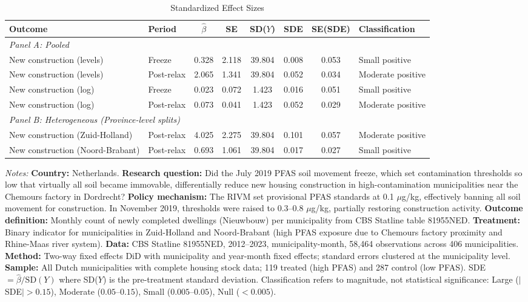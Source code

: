 \begin{table}[htbp]
\centering
\caption{Standardized Effect Sizes}
\label{tab:sde}
\begin{threeparttable}
\scriptsize
\begin{tabular}{llcccccl}
\hline\hline
Outcome & Period & $\hat{\beta}$ & SE & SD($Y$) & SDE & SE(SDE) & Classification \\
\hline
\multicolumn{8}{l}{\textit{Panel A: Pooled}} \\
New construction (levels) & Freeze & 0.328 & 2.118 & 39.804 & 0.008 & 0.053 & Small positive \\
New construction (levels) & Post-relax & 2.065 & 1.341 & 39.804 & 0.052 & 0.034 & Moderate positive \\
New construction (log) & Freeze & 0.023 & 0.072 & 1.423 & 0.016 & 0.051 & Small positive \\
New construction (log) & Post-relax & 0.073 & 0.041 & 1.423 & 0.052 & 0.029 & Moderate positive \\
\hline
\multicolumn{8}{l}{\textit{Panel B: Heterogeneous (Province-level splits)}} \\
New construction (Zuid-Holland) & Post-relax & 4.025 & 2.275 & 39.804 & 0.101 & 0.057 & Moderate positive \\
New construction (Noord-Brabant) & Post-relax & 0.693 & 1.061 & 39.804 & 0.017 & 0.027 & Small positive \\
\hline\hline
\end{tabular}
\begin{tablenotes}[flushleft]
\small
\item \textit{Notes:} \textbf{Country:} Netherlands. \textbf{Research question:} Did the July 2019 PFAS soil movement freeze, which set contamination thresholds so low that virtually all soil became immovable, differentially reduce new housing construction in high-contamination municipalities near the Chemours factory in Dordrecht? \textbf{Policy mechanism:} The RIVM set provisional PFAS standards at 0.1 $\mu$g/kg, effectively banning all soil movement for construction. In November 2019, thresholds were raised to 0.3--0.8 $\mu$g/kg, partially restoring construction activity. \textbf{Outcome definition:} Monthly count of newly completed dwellings (Nieuwbouw) per municipality from CBS Statline table 81955NED. \textbf{Treatment:} Binary indicator for municipalities in Zuid-Holland and Noord-Brabant (high PFAS exposure due to Chemours factory proximity and Rhine-Maas river system). \textbf{Data:} CBS Statline 81955NED, 2012--2023, municipality-month, 58,464 observations across 406 municipalities. \textbf{Method:} Two-way fixed effects DiD with municipality and year-month fixed effects; standard errors clustered at the municipality level. \textbf{Sample:} All Dutch municipalities with complete housing stock data; 119 treated (high PFAS) and 287 control (low PFAS). SDE $= \hat{\beta} / \text{SD}(Y)$ where SD($Y$) is the pre-treatment standard deviation. Classification refers to magnitude, not statistical significance: Large ($|$SDE$| > 0.15$), Moderate ($0.05$--$0.15$), Small ($0.005$--$0.05$), Null ($< 0.005$).
\end{tablenotes}
\end{threeparttable}
\end{table}

